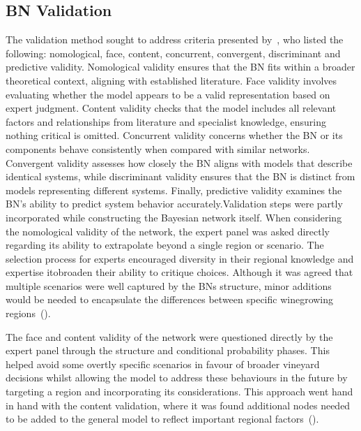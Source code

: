 \documentclass[10pt,letterpaper]{article}
\begin{document}
\subsection*{BN Validation}

The validation method sought to address criteria presented by~\cite{pitchforthProposedValidationFramework2013}, who listed the following:  nomological, face, content, concurrent, convergent, discriminant and predictive validity. Nomological validity ensures that the BN fits within a broader theoretical context, aligning with established literature. Face validity involves evaluating whether the model appears to be a valid representation based on expert judgment. Content validity checks that the model includes all relevant factors and relationships from literature and specialist knowledge, ensuring nothing critical is omitted. Concurrent validity concerns whether the BN or its components behave consistently when compared with similar networks. Convergent validity assesses how closely the BN aligns with models that describe identical systems, while discriminant validity ensures that the BN is distinct from models representing different systems. Finally, predictive validity examines the BN's ability to predict system behavior accurately.Validation steps were partly incorporated while constructing the Bayesian network itself. When considering the nomological validity of the network, the expert panel was asked directly regarding its ability to extrapolate beyond a single region or scenario. The selection process for experts encouraged diversity in their regional knowledge and expertise itobroaden their ability to critique choices. Although it was agreed that multiple scenarios were well captured by the BNs structure, minor additions would be needed to encapsulate the differences between specific winegrowing regions~(\cite{abbalDecisionSupportSystem2016,agostaRegionalClimateVariability2012,soarClimateDriversRed2008}).

The face and content validity of the network were questioned directly by the expert panel through the structure and conditional probability phases. This helped avoid some overtly specific scenarios in favour of broader vineyard decisions whilst allowing the model to address these behaviours in the future by targeting a region and incorporating its considerations. This approach went hand in hand with the content validation, where it was found additional nodes needed to be added to the general model to reflect important regional factors~(\cite{abbalDecisionSupportSystem2016,ellisUsingBayesianGrowth2020,agostaRegionalClimateVariability2012,barriguinhaVineyardYieldEstimation2021,brockRelationSoilOrganic2011}).
\end{document}
